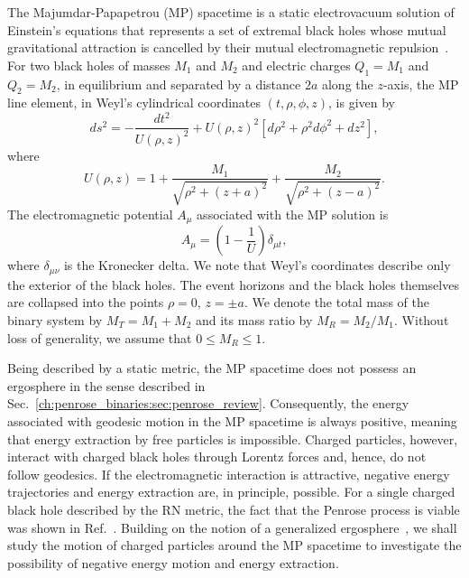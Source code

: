The Majumdar-Papapetrou (MP) spacetime is a static electrovacuum solution of Einstein's equations that represents a set of extremal black holes whose mutual gravitational attraction is cancelled by their mutual electromagnetic repulsion~\cite{MAJUMDAR1947,PAPAPETROU1947,HARTLE1972}.
For two black holes of masses $M_1$ and $M_2$ and electric charges $Q_1=M_1$ and $Q_2=M_2$, in equilibrium and separated by a distance $2a$ along the $z$-axis, the MP line element, in Weyl's cylindrical coordinates $(t,\rho,\phi,z)$, is given by~\cite{SMERAK2016}
\begin{equation}
  d s^2 = - \frac{d t^2}{U(\rho,z)^{2}} + U(\rho,z)^2\left[d\rho^2 + \rho^2 d\phi^2 + d z^2\right],
  \label{eq:majumdar_papapetrou_line_element}
\end{equation}
%
where
\begin{equation}
  U(\rho,z) = 1 + \frac{M_1}{\sqrt{\rho^2 + (z+a)^2}} + \frac{M_2}{\sqrt{\rho^2 + (z-a)^2}}.
  \label{eq:mp_metric_potential_cylindric}
\end{equation}
The electromagnetic potential $A_\mu$ associated with the MP solution is
\begin{equation}
  A_\mu = \left(1 - \frac{1}{U}\right) \delta_{\mu t},
  \label{eq:electromagnetic_potential_mp}
\end{equation}
where $\delta_{\mu \nu}$ is the Kronecker delta. We note that Weyl's coordinates describe only the exterior of the black holes. The event horizons and the black holes themselves are collapsed into the points $\rho=0, \, z=\pm a$. We denote the total mass of the binary system by $M_T=M_1+M_2$ and its mass ratio by $M_R=M_2/M_1$. Without loss of generality, we assume that $0 \le M_R \le 1$.

Being described by a static metric, the MP spacetime does not possess an ergosphere in the sense described in Sec.~\ref{ch:penrose_binaries:sec:penrose_review}. Consequently, the energy associated with geodesic motion in the MP spacetime is always positive, meaning that energy extraction by free particles is impossible. Charged particles, however, interact with charged black holes through Lorentz forces and, hence, do not follow geodesics.
If the electromagnetic interaction is attractive, negative energy trajectories and energy extraction are, in principle, possible. For a single charged black hole described by the RN metric, the fact that the Penrose process is viable was shown in Ref.~\cite{DENARDO1973}. Building on the notion of a generalized ergosphere~\cite{RUFFINI1971,DENARDO1973}, we shall study the motion of charged particles around the MP spacetime to investigate the possibility of negative energy motion and energy extraction.

